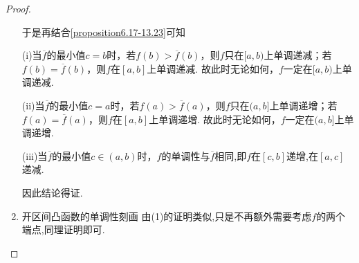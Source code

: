 \documentclass[../../main.tex]{subfiles}
\begin{document}
\begin{proof}
\begin{enumerate}
于是再结合\eqref{proposition6.17-13.23}可知

(i)当\(\overline{f}\)的最小值\(c = b\)时，若\(f(b)>\overline{f}(b)\)，则\(f\)只在\([a,b)\)上单调递减；若\(f(b)=\overline{f}(b)\)，则\(f\)在\([a,b]\)上单调递减. 故此时无论如何，\(f\)一定在\([a,b)\)上单调递减.

(ii)当\(\overline{f}\)的最小值\(c = a\)时，若\(f(a)>\overline{f}(a)\)，则\(f\)只在\((a,b]\)上单调递增；若\(f(a)=\overline{f}(a)\)，则\(f\)在\([a,b]\)上单调递增. 故此时无论如何，\(f\)一定在\((a,b]\)上单调递增.

(iii)当\(\overline{f}\)的最小值\(c\in(a,b)\)时，\(f\)的单调性与\(\overline{f}\)相同,即\(f\)在\([c,b]\)递增,在\([a,c]\)递减.

因此结论得证.

\item {\heiti 开区间凸函数的单调性刻画}
由(1)的证明类似,只是不再额外需要考虑$f$的两个端点,同理证明即可.
\end{enumerate}
\end{proof}
\end{document}
